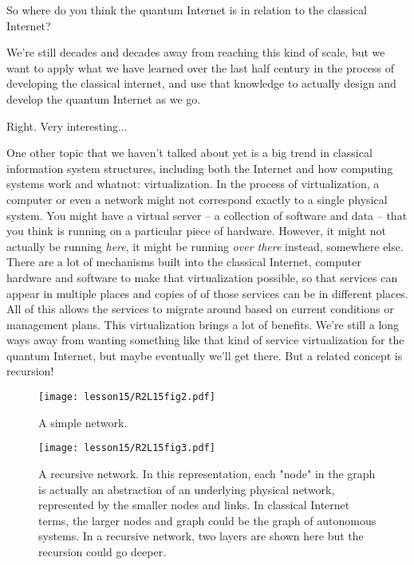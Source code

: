 \mmm So where do you think the quantum Internet is in relation to the classical Internet?

\rrr We're still decades and decades away from reaching this kind of scale, but we want to apply what we have learned over the last half century in the process of developing the classical internet, and use that knowledge to actually design and develop the quantum Internet as we go.

\mmm Right. Very interesting...

\rrr One other topic that we haven't talked about yet is a big trend in classical information system structures, including both the Internet and how computing systems work and whatnot: virtualization. In the process of virtualization, a computer or even a network might not correspond exactly to a single physical system. You might have a virtual server -- a collection of software and data -- that you think is running on a particular piece of hardware.  However, it might not actually be running \emph{here}, it might be running \emph{over there} instead, somewhere else. There are a lot of mechanisms built into the classical Internet, computer hardware and software to make that virtualization possible, so that services can appear in multiple places and copies of of those services can be in different places. All of this allows the services to migrate around based on current conditions or management plans. This virtualization brings a lot of benefits. We're still a long ways away from wanting something like that kind of service virtualization for the quantum Internet, but maybe eventually we'll get there. But a related concept is recursion!


\begin{figure}[t]
    \centering
    \texttt{[image: lesson15/R2L15fig2.pdf]}
    \caption[A simple network]{A simple network.}
    \label{fig:15-2-simple}
\end{figure}

\begin{figure}[t]
    \centering
    \texttt{[image: lesson15/R2L15fig3.pdf]}
    \caption[A recursive network]{A recursive network. In this representation, each "node" in the graph is actually an abstraction of an underlying physical network, represented by the smaller nodes and links. In classical Internet terms, the larger nodes and graph could be the graph of autonomous systems.  In a  recursive network, two layers are shown here but the recursion could go deeper.}
    \label{fig:15-3-recursive}
\end{figure}

